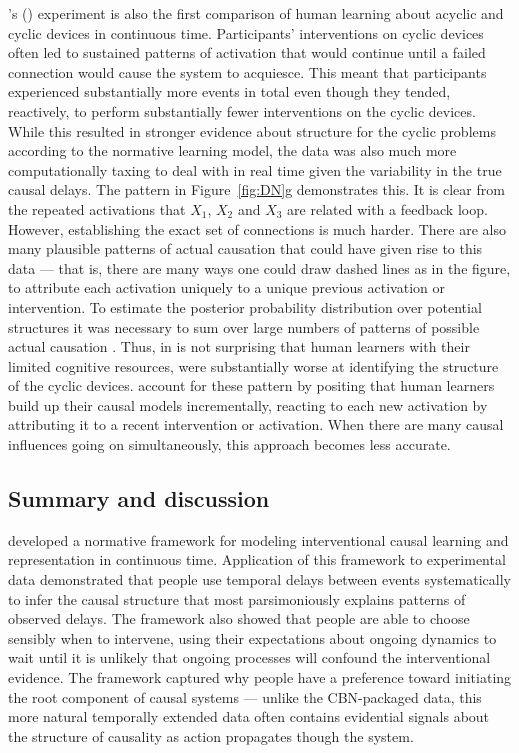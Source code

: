 \documentclass{cambridge7A}%
\def\citeapos#1{\citeauthor{#1}'s (\citeyear{#1})}
\begin{document}
\citeapos{bramley2017dynamic} experiment is also the first comparison of human learning about acyclic and cyclic devices in continuous time.  %
Participants' interventions on cyclic devices often led to sustained patterns of activation that would continue until a failed connection would cause the system to acquiesce.  This meant that participants experienced substantially more events in total even though they tended, reactively, to perform substantially fewer interventions on the cyclic devices.  While this resulted in stronger evidence about structure for the cyclic problems according to the normative learning model, the data was also much more computationally taxing to deal with in real time given the variability in the true causal delays.  The pattern in Figure~\ref{fig:DN}g demonstrates this.  It is clear from the repeated activations that $X_1$, $X_2$ and $X_3$ are related with a feedback loop.   However, establishing the exact set of connections is much harder. There are also many plausible patterns of actual causation that could have given rise to this data --- that is, there are many ways one could draw dashed lines as in the figure, to attribute each activation uniquely to a unique previous activation or intervention.   To estimate the posterior probability distribution over potential structures it was necessary to sum over large numbers of patterns of possible actual causation \citep{halpern2016causality}.  Thus, in is not surprising that human learners with their limited cognitive resources, were substantially worse at identifying the structure of the cyclic devices.  \cite{bramley2017dynamic} account for these pattern by positing that human learners build up their causal models incrementally, reacting to each new activation by attributing it to a recent intervention or activation.  When there are many causal influences going on simultaneously, this approach becomes less accurate.

\subsection{Summary and discussion}

\cite{bramley2018time} developed a normative framework for modeling interventional causal learning and representation in continuous time.  Application of this framework to experimental data demonstrated that people use temporal delays between events systematically to infer the causal structure that most parsimoniously explains patterns of observed delays.  %
The framework also showed that people are able to choose sensibly when to intervene, using their expectations about ongoing dynamics to wait until it is unlikely that ongoing processes will confound the interventional evidence.  The framework captured why people have a preference toward initiating the root component of causal systems --- unlike the CBN-packaged data, this more natural temporally extended data often contains evidential signals about the structure of causality as action propagates though the system.
\end{document}
